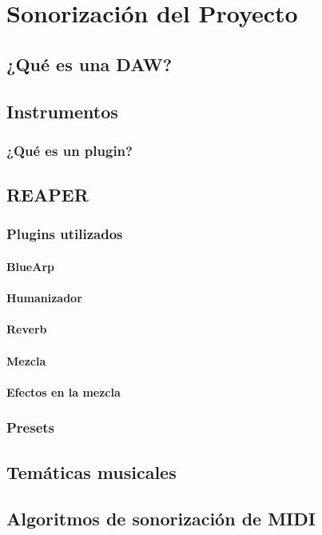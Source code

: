 \chapter{Sonorización del Proyecto}

\section{¿Qué es una DAW?}
\section{Instrumentos}

\subsection{¿Qué es un plugin?}\label{subsec:plugin}

\section{REAPER}

\subsection{Plugins utilizados}

    \subsubsection{BlueArp}\label{subsec:bluearp}
    \subsubsection{Humanizador}
    \subsubsection{Reverb}
    \subsubsection{Mezcla}
    \subsubsection{Efectos en la mezcla}

\subsection{Presets}

\section{Temáticas musicales}

\section{Algoritmos de sonorización de MIDI}



